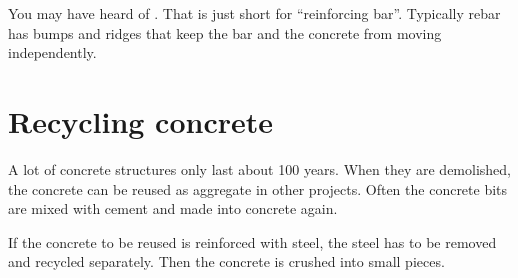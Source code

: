 You may have heard of .  That is just short for
``reinforcing bar''.  Typically rebar has bumps and ridges that keep
the bar and the concrete from moving independently.

\section{Recycling concrete}

A lot of concrete structures only last about 100 years. When they are
demolished, the concrete can be reused as aggregate in other projects.
Often the concrete bits are mixed with cement and made into concrete again.

If the concrete to be reused is reinforced with steel, the steel has
to be removed and recycled separately.  Then the concrete is crushed
into small pieces.
